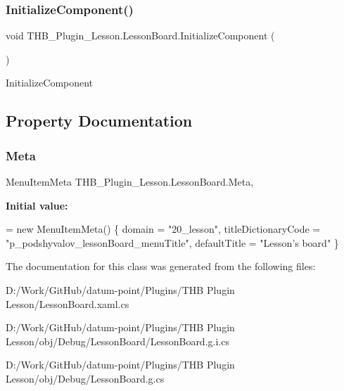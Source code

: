 \subsubsection{\texorpdfstring{Initialize\+Component()}{InitializeComponent()}\hspace{0.1cm}{\footnotesize\ttfamily [5/5]}}
{\footnotesize\ttfamily void T\+H\+B\+\_\+\+Plugin\+\_\+\+Lesson.\+Lesson\+Board.\+Initialize\+Component (\begin{DoxyParamCaption}{ }\end{DoxyParamCaption})}



Initialize\+Component 



\subsection{Property Documentation}
\mbox{\label{class_t_h_b___plugin___lesson_1_1_lesson_board_a8e0dbfdf59e44583f46bcd3728288e19}} 
\subsubsection{\texorpdfstring{Meta}{Meta}}
{\footnotesize\ttfamily Menu\+Item\+Meta T\+H\+B\+\_\+\+Plugin\+\_\+\+Lesson.\+Lesson\+Board.\+Meta\hspace{0.3cm}{\ttfamily [get]}, {\ttfamily [set]}}

{\bfseries Initial value\+:}
\begin{DoxyCode}
= \textcolor{keyword}{new} MenuItemMeta()
        \{
            domain = \textcolor{stringliteral}{"20\_lesson"},
            titleDictionaryCode = \textcolor{stringliteral}{"p\_podshyvalov\_lessonBoard\_menuTitle"},
            defaultTitle = \textcolor{stringliteral}{"Lesson's board"}
        \}
\end{DoxyCode}


The documentation for this class was generated from the following files\+:\begin{DoxyCompactItemize}
\item 
D\+:/\+Work/\+Git\+Hub/datum-\/point/\+Plugins/\+T\+H\+B Plugin Lesson/Lesson\+Board.\+xaml.\+cs\item 
D\+:/\+Work/\+Git\+Hub/datum-\/point/\+Plugins/\+T\+H\+B Plugin Lesson/obj/\+Debug/\+Lesson\+Board/Lesson\+Board.\+g.\+i.\+cs\item 
D\+:/\+Work/\+Git\+Hub/datum-\/point/\+Plugins/\+T\+H\+B Plugin Lesson/obj/\+Debug/Lesson\+Board.\+g.\+cs\end{DoxyCompactItemize}
